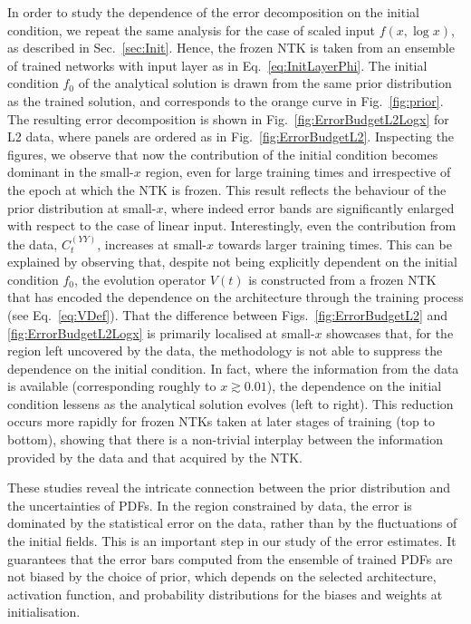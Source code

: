 In order to study the dependence of the error decomposition on the initial
condition, we repeat the same analysis for the case of scaled input $f(x, \log
x)$, as described in Sec.~\ref{sec:Init}. Hence, the frozen NTK is taken from an
ensemble of trained networks with input layer as in Eq.~\eqref{eq:InitLayerPhi}.
The initial condition $f_0$ of the analytical solution is drawn from the same
prior distribution as the trained solution, and corresponds to the orange curve
in Fig.~\ref{fig:prior}. The resulting error decomposition is shown in
Fig.~\ref{fig:ErrorBudgetL2Logx} for L2 data, where panels are ordered as in
Fig.~\ref{fig:ErrorBudgetL2}. Inspecting the figures, we observe that now the
contribution of the initial condition becomes dominant in the small-$x$ region,
even for large training times and irrespective of the epoch at which the NTK is
frozen. This result reflects the behaviour of the prior distribution at
small-$x$, where indeed error bands are significantly enlarged with respect to
the case of linear input. Interestingly, even the contribution from the data,
$C^{(YY)}_t$, increases at small-$x$ towards larger training times. This can be
explained by observing that, despite not being explicitly dependent on the
initial condition $f_0$, the evolution operator $V(t)$ is constructed from a
frozen NTK that has encoded the dependence on the architecture through the
training process (see Eq.~\eqref{eq:VDef}). That the difference between
Figs.~\ref{fig:ErrorBudgetL2} and \ref{fig:ErrorBudgetL2Logx} is primarily
localised at small-$x$ showcases that, for the region left uncovered by the
data, the methodology is not able to suppress the dependence on the initial
condition. In fact, where the information from the data is available
(corresponding roughly to $x \gtrsim 0.01$), the dependence on the initial
condition lessens as the analytical solution evolves (left to right). This
reduction occurs more rapidly for frozen NTKs taken at later stages of training
(top to bottom), showing that there is a non-trivial interplay between the
information provided by the data and that acquired by the NTK.

These studies reveal the intricate connection between the prior distribution and
the uncertainties of PDFs. In the region constrained by data, the error is
dominated by the statistical error on the data, rather than by the fluctuations
of the initial fields. This is an important step in our study of the error
estimates. It guarantees that the error bars computed from the ensemble of
trained PDFs are not biased by the choice of prior, which depends on the selected
architecture, activation function, and probability distributions for the biases
and weights at initialisation.

